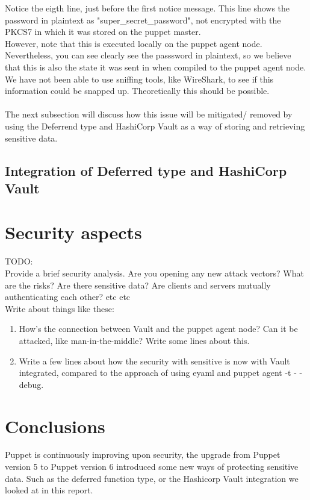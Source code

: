 Notice the eigth line, just before the first notice message. This line shows the password in plaintext as "super\_secret\_password", not encrypted with the PKCS7 in which it was stored on the puppet master.
\\
However, note that this is executed locally on the puppet agent node. Nevertheless, you can see clearly see the passsword in plaintext, so we believe that this is also the state it was sent in when compiled to the puppet agent node. We have not been able to use sniffing tools, like WireShark, to see if this information could be snapped up. Theoretically this should be possible.
\\\\
The next subsection will discuss how this issue will be mitigated/ removed by using the Deferrend type and HashiCorp Vault as a way of storing and retrieving sensitive data.

\subsection{Integration of Deferred type and HashiCorp Vault}


\section{Security aspects}

TODO:\\
Provide a brief security analysis. Are you opening any new attack vectors? What
are the risks? Are there sensitive data? Are clients and servers mutually
authenticating each other? etc etc
\\
Write about things like these:
\begin{enumerate}
    \item How's the connection between Vault and the puppet agent node? Can it be attacked, like man-in-the-middle? Write some lines about this.
    \item Write a few lines about how the security with sensitive is now with Vault integrated, compared to the approach of using eyaml and puppet agent -t - -debug. 
\end{enumerate}

\section{Conclusions}

Puppet is continuously improving upon security, the upgrade from Puppet version 5 to Puppet version 6 introduced some new ways of protecting sensitive data. Such as the deferred function type, or the Hashicorp Vault integration we looked at in this report.



